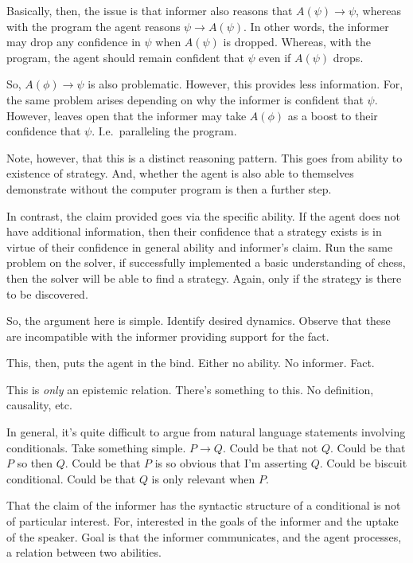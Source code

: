 \documentclass[10pt]{article}
\begin{document}
\begin{note}
Basically, then, the issue is that informer also reasons that \(A(\psi) \rightarrow \psi\), whereas with the program the agent reasons \(\psi \rightarrow A(\psi)\).
In other words, the informer may drop any confidence in \(\psi\) when \(A(\psi)\) is dropped.
Whereas, with the program, the agent should remain confident that \(\psi\) even if \(A(\psi)\) drops.

So, \(A(\phi) \rightarrow \psi\) is also problematic.
However, this provides less information.
For, the same problem arises depending on why the informer is confident that \(\psi\).
However, leaves open that the informer may take \(A(\phi)\) as a boost to their confidence that \(\psi\).
I.e.\ paralleling the program.

Note, however, that this is a distinct reasoning pattern.
This goes from ability to existence of strategy.
And, whether the agent is also able to themselves demonstrate without the computer program is then a further step.

In contrast, the claim provided goes via the specific ability.
If the agent does not have additional information, then their confidence that a strategy exists is in virtue of their confidence in general ability and informer's claim.
Run the same problem on the solver, if successfully implemented a basic understanding of chess, then the solver will be able to find a strategy.
Again, only if the strategy is there to be discovered.
\end{note}


So, the argument here is simple.
Identify desired dynamics.
Observe that these are incompatible with the informer providing support for the fact.

This, then, puts the agent in the bind.
Either no ability.
No informer.
Fact.

This is \emph{only} an epistemic relation.
There's something to this.
No definition, causality, etc.

In general, it's quite difficult to argue from natural language statements involving conditionals.
Take something simple.
\(P \rightarrow Q\).
Could be that not \(Q\).
Could be that \(P\) so then \(Q\).
Could be that \(P\) is so obvious that I'm asserting \(Q\).
Could be biscuit conditional.
Could be that \(Q\) is only relevant when \(P\).

That the claim of the informer has the syntactic structure of a conditional is not of particular interest.
For, interested in the goals of the informer and the uptake of the speaker.
Goal is that the informer communicates, and the agent processes, a relation between two abilities.
\end{document}
